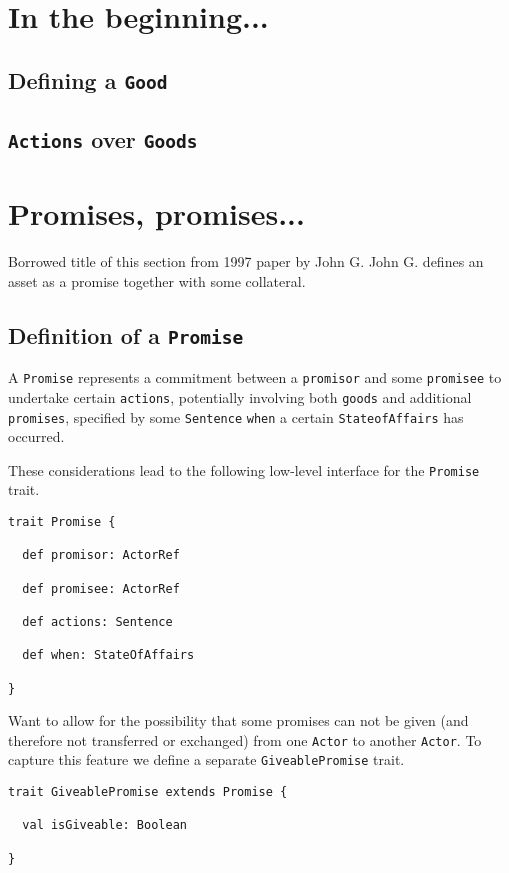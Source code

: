 \documentclass[a4paper]{article}
\begin{document}
\section{In the beginning...}

\subsection{Defining a \texttt{Good}}

\subsection{\texttt{Actions} over \texttt{Goods}}

\section{Promises, promises...}
Borrowed title of this section from 1997 paper by John G. John G. defines an asset as a promise together with some collateral.

\subsection{Definition of a \texttt{Promise}}
A \texttt{Promise} represents a commitment between a \texttt{promisor} and some \texttt{promisee} to undertake certain \texttt{actions}, potentially involving both \texttt{goods} and additional \texttt{promises}, specified by some \texttt{Sentence} \texttt{when} a certain \texttt{StateofAffairs} has occurred. 

These considerations lead to the following low-level interface for the \texttt{Promise} trait.

\begin{verbatim}
trait Promise {

  def promisor: ActorRef
 
  def promisee: ActorRef
  
  def actions: Sentence
  
  def when: StateOfAffairs

}
\end{verbatim}

Want to allow for the possibility that some promises can not be given (and therefore not transferred or exchanged) from one \texttt{Actor} to another \texttt{Actor}. To capture this feature we define a separate \texttt{GiveablePromise} trait.

\begin{verbatim}
trait GiveablePromise extends Promise {

  val isGiveable: Boolean

}
\end{verbatim}
\end{document}
